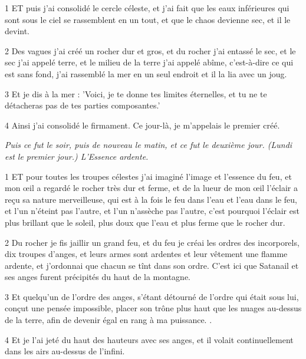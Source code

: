 \par 1 ET puis j'ai consolidé le cercle céleste, et j'ai fait que les eaux inférieures qui sont sous le ciel se rassemblent en un tout, et que le chaos devienne sec, et il le devint.

\par 2 Des vagues j'ai créé un rocher dur et gros, et du rocher j'ai entassé le sec, et le sec j'ai appelé terre, et le milieu de la terre j'ai appelé abîme, c'est-à-dire ce qui est sans fond, j'ai rassemblé la mer en un seul endroit et il la lia avec un joug.

\par 3 Et je dis à la mer : 'Voici, je te donne tes limites éternelles, et tu ne te détacheras pas de tes parties composantes.'

\par 4 Ainsi j'ai consolidé le firmament. Ce jour-là, je m'appelais le premier créé.


\par \textit{Puis ce fut le soir, puis de nouveau le matin, et ce fut le deuxième jour. (Lundi est le premier jour.) L'Essence ardente.}

\par 1 ET pour toutes les troupes célestes j'ai imaginé l'image et l'essence du feu, et mon œil a regardé le rocher très dur et ferme, et de la lueur de mon œil l'éclair a reçu sa nature merveilleuse, qui est à la fois le feu dans l'eau et l'eau dans le feu, et l'un n'éteint pas l'autre, et l'un n'assèche pas l'autre, c'est pourquoi l'éclair est plus brillant que le soleil, plus doux que l'eau et plus ferme que le rocher dur.

\par 2 Du rocher je fis jaillir un grand feu, et du feu je créai les ordres des incorporels, dix troupes d'anges, et leurs armes sont ardentes et leur vêtement une flamme ardente, et j'ordonnai que chacun se tînt dans son ordre. C'est ici que Satanail et ses anges furent précipités du haut de la montagne.

\par 3 Et quelqu'un de l'ordre des anges, s'étant détourné de l'ordre qui était sous lui, conçut une pensée impossible, placer son trône plus haut que les nuages ​​​​au-dessus de la terre, afin de devenir égal en rang à ma puissance. .

\par 4 Et je l'ai jeté du haut des hauteurs avec ses anges, et il volait continuellement dans les airs au-dessus de l'infini.

